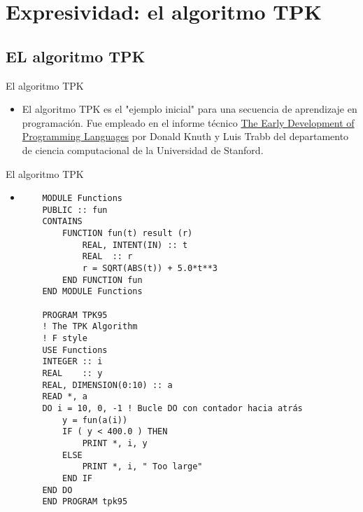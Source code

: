 
\section{Expresividad: el algoritmo TPK}


\subsection{EL algoritmo TPK}

\begin{frame}[fragile]{El algoritmo TPK}
 \begin{itemize}[<+(1)->]
 \item El algoritmo TPK es el "ejemplo inicial" para una secuencia de aprendizaje en programación. Fue empleado en el informe técnico \href{http://bitsavers.org/pdf/stanford/cs_techReports/STAN-CS-76-562_EarlyDevelPgmgLang_Aug76.pdf}{The Early Development of Programming Languages}  por Donald Knuth y Luis Trabb del departamento de ciencia computacional de la Universidad de Stanford.   
 \end{itemize}
\end{frame}

\begin{frame}[fragile]{El algoritmo TPK}
 \begin{itemize}[<+(0)->]
    \item []
    \begin{verbatim}  
    MODULE Functions
    PUBLIC :: fun
    CONTAINS
        FUNCTION fun(t) result (r)
            REAL, INTENT(IN) :: t
            REAL  :: r
            r = SQRT(ABS(t)) + 5.0*t**3
        END FUNCTION fun
    END MODULE Functions

    PROGRAM TPK95
    ! The TPK Algorithm
    ! F style
    USE Functions
    INTEGER :: i
    REAL    :: y
    REAL, DIMENSION(0:10) :: a
    READ *, a
    DO i = 10, 0, -1 ! Bucle DO con contador hacia atrás
        y = fun(a(i))
        IF ( y < 400.0 ) THEN
            PRINT *, i, y
        ELSE
            PRINT *, i, " Too large"
        END IF
    END DO
    END PROGRAM tpk95
  \end{verbatim}
   \end{itemize} 
\end{frame}